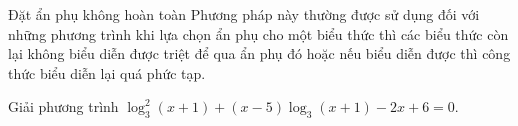 \begin{dang}{Đặt ẩn phụ không hoàn toàn}
Phương pháp này thường được sử dụng đối với những phương trình khi lựa chọn ẩn phụ cho một biểu thức thì các biểu thức còn lại không biểu diễn được triệt để qua ẩn phụ đó hoặc nếu biểu diễn được thì công thức biểu diễn lại quá phức tạp.
\end{dang}
	\begin{vd}%
		Giải phương trình $\log_3^2\left(x+1\right)+\left(x-5\right)\log_3\left(x+1\right)-2x+6=0.$
	\end{vd}

